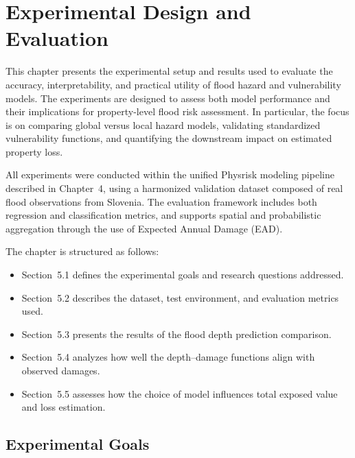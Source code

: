\chapter{Experimental Design and Evaluation}
\label{chap:experimental-analysis}

This chapter presents the experimental setup and results used to evaluate the accuracy, interpretability, and practical utility of flood hazard and vulnerability models. The experiments are designed to assess both model performance and their implications for property-level flood risk assessment. In particular, the focus is on comparing global versus local hazard models, validating standardized vulnerability functions, and quantifying the downstream impact on estimated property loss.

All experiments were conducted within the unified Physrisk modeling pipeline described in Chapter~4, using a harmonized validation dataset composed of real flood observations from Slovenia. The evaluation framework includes both regression and classification metrics, and supports spatial and probabilistic aggregation through the use of Expected Annual Damage (EAD).

The chapter is structured as follows:

\begin{itemize}
    \item Section~5.1 defines the experimental goals and research questions addressed.
    \item Section~5.2 describes the dataset, test environment, and evaluation metrics used.
    \item Section~5.3 presents the results of the flood depth prediction comparison.
    \item Section~5.4 analyzes how well the depth--damage functions align with observed damages.
    \item Section~5.5 assesses how the choice of model influences total exposed value and loss estimation.
\end{itemize}

\section{Experimental Goals}

